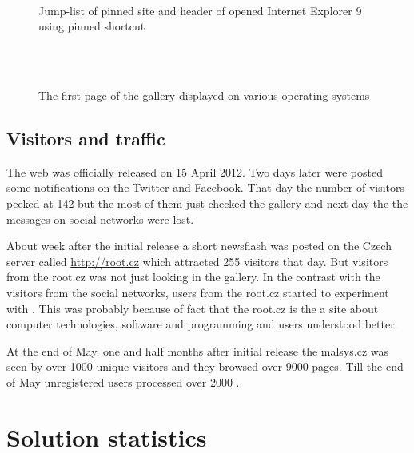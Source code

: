 \begin{figure}[h]
	\centering
	 ~
	\caption{Jump-list of pinned site and header of opened Internet Explorer 9 using pinned shortcut}
	\label{fig:galleryInDevices}
\end{figure}


\begin{figure}[p]
	\centering
	\\
	 ~
	 ~
	\caption{The first page of the gallery displayed on various operating systems}
	\label{fig:pinIe}
\end{figure}


\subsection{Visitors and traffic}

The web was officially released on 15 April 2012.
Two days later were posted some notifications on the Twitter and Facebook.
That day the number of visitors peeked at 142 but the most of them just checked the gallery and next day the the messages on social networks were lost.

About week after the initial release a short newsflash was posted on the Czech server called \url{http://root.cz} which attracted 255 visitors that day.
But visitors from the root.cz was not just looking in the gallery.
In the contrast with the visitors from the social networks, users from the root.cz started to experiment with \lsystems.
This was probably because of fact that the root.cz is the a site about computer technologies, software and programming and users understood \lsystems better.

At the end of May, one and half months after initial release the malsys.cz was seen by over 1000 unique visitors and they browsed over 9000 pages.
Till the end of May unregistered users processed over 2000 \lsystems.


\section{Solution statistics}

